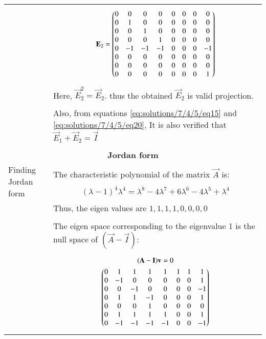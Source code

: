 \begin{longtable}{|p{4cm}|p{14cm}|}
		&\begin{gather}
		    \mathbf{E}_2=\begin{pmatrix}0 &0  &0  &0  &0  &0  &0  &0 \\ 
0 &1 &0  &0  &0  &0  &0  &0 \\ 
0 &0  &1 &0  &0  &0  &0  &0 \\
0 &0  &0  &1  &0  &0  &0  &0 \\ 
0 &-1  &-1  &-1  &0  &0  &0  &-1 \\ 
0 &0  &0  &0  &0  &0  &0  &0 \\ 
0 &0  &0  &0  &0  &0  &0 &0 \\ 
0 &0  &0  &0  &0  &0  &0  &1 \end{pmatrix} \label{eq:solutions/7/4/5/eq20}
		\end{gather}\\
		&Here, $\vec{E}_2^2=\vec{E}_2$. thus the obtained $\vec{E}_2$ is valid projection. \\
		&\\
		&Also, from equations \eqref{eq:solutions/7/4/5/eq15} and \eqref{eq:solutions/7/4/5/eq20}, It is also verified that $\vec{E}_1+\vec{E}_2=\vec{I}$\\
		&\\ 
		\hline
		\multicolumn{2}{|c|}{\textbf{Jordan form}}\\
		\hline
		\multirow{3}{*}{Finding Jordan form} & \\
		& The characteristic polynomial of the matrix $\vec{A}$ is:\\
		&\begin{gather}
		    (\lambda-1)^4\lambda^4=\lambda^8-4\lambda^7+6\lambda^6-4\lambda^5+\lambda^4
		\end{gather}\\
		&Thus, the eigen values are $1,1,1,1,0,0,0,0$\\
		&\\
		&The eigen space corresponding to the eigenvalue 1 is the null space of $(\vec{A}-\vec{I})$:\\
		&\begin{gather}
		    (\mathbf{A}-\mathbf{I})\mathbf{v}=0\\
		    \begin{pmatrix}0&  1&  1&  1&  1& 1& 1&  1\\
0& -1&  0&  0&  0& 0& 0&  1\\
0&  0& -1&  0&  0& 0& 0& -1\\
0&  1&  1& -1&  0& 0& 0&  1\\
0&  0&  0&  1&  0& 0& 0&  0\\
0&  1&  1&  1&  1& 0& 0&  1\\
0& -1& -1& -1& -1& 0& 0& -1\\
\end{pmatrix}
\end{gather}
\end{longtable}
